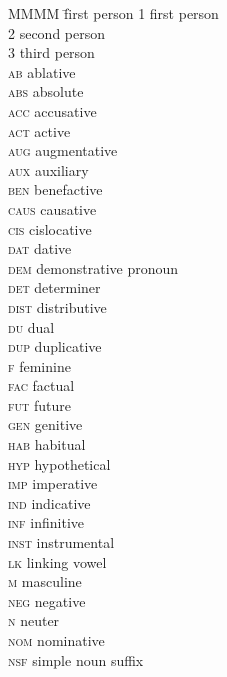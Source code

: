 \addchap{\lsAbbreviationsTitle}
\begin{multicols}{2}
\begin{tabbing}
MMMM \= first person\kill
\textsc{1}     \> first person\\
2              \> second person\\
3              \> third person\\
\textsc{ab}    \> ablative\\
\textsc{abs}   \>  absolute\\
\textsc{acc}   \>  accusative\\
\textsc{act}   \>  active\\
\textsc{aug}   \>  augmentative\\
\textsc{aux}   \>  auxiliary\\
\textsc{ben}   \>  benefactive\\
\textsc{caus}  \> causative\\
\textsc{cis}   \>  cislocative\\
\textsc{dat}   \>  dative\\
\textsc{dem}   \>  demonstrative pronoun\\
\textsc{det}   \>  determiner\\
\textsc{dist}  \>   distributive\\
\textsc{du}    \>   dual\\
\textsc{dup}   \>  duplicative\\
\textsc{f}     \>  feminine\\
\textsc{fac}   \>  factual\\
\textsc{fut}   \>  future\\
\textsc{gen}   \>  genitive\\
\textsc{hab}   \>  habitual\\
\textsc{hyp}   \>  hypothetical\\
\textsc{imp}   \>  imperative\\
\textsc{ind}   \>  indicative\\
\textsc{inf}   \>  infinitive\\
\textsc{inst}  \>   instrumental\\
\textsc{lk}    \>   linking vowel\\
\textsc{m}     \>  masculine\\
\textsc{neg}   \>    negative\\
\textsc{n}     \>  neuter\\
\textsc{nom}   \>  nominative\\
\textsc{nsf}   \>   simple noun suffix\\

\end{tabbing}
\end{multicols}
